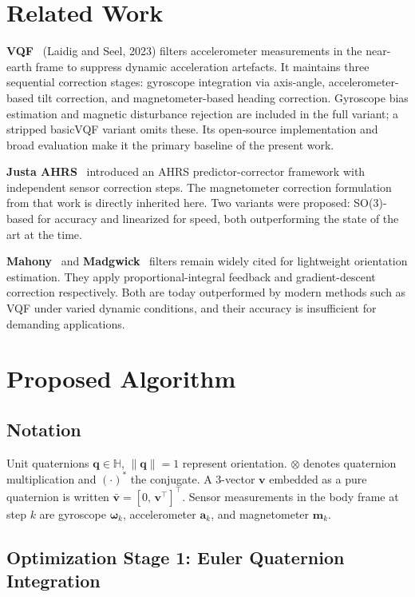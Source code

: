 \documentclass[conference]{IEEEtran}
\begin{document}
\section{Related Work}

\textbf{VQF}~\cite{laidig2023vqf} (Laidig and Seel, 2023) filters accelerometer measurements in the near-earth frame to suppress dynamic acceleration artefacts. It maintains three sequential correction stages: gyroscope integration via axis-angle, accelerometer-based tilt correction, and magnetometer-based heading correction. Gyroscope bias estimation and magnetic disturbance rejection are included in the full variant; a stripped basicVQF variant omits these. Its open-source implementation and broad evaluation make it the primary baseline of the present work.

\textbf{Justa AHRS}~\cite{justa2020} introduced an AHRS predictor-corrector framework with independent sensor correction steps. The magnetometer correction formulation from that work is directly inherited here. Two variants were proposed: SO(3)-based for accuracy and linearized for speed, both outperforming the state of the art at the time.

\textbf{Mahony}~\cite{mahony2008} and \textbf{Madgwick}~\cite{madgwick2010} filters remain widely cited for lightweight orientation estimation. They apply proportional-integral
 feedback and gradient-descent correction respectively. Both are today outperformed by modern methods such as VQF under varied dynamic conditions, 
 and their accuracy is insufficient for demanding applications.

\section{Proposed Algorithm}

\subsection{Notation}

Unit quaternions $\mathbf{q} \in \mathbb{H}$, $\|\mathbf{q}\|=1$ represent orientation. $\otimes$ denotes quaternion multiplication and $(\cdot)^*$ the conjugate. A 3-vector $\mathbf{v}$ embedded as a pure quaternion is written $\bar{\mathbf{v}} = [0,\,\mathbf{v}^\top]^\top$. Sensor measurements in the body frame at step $k$ are gyroscope $\boldsymbol{\omega}_k$, accelerometer $\mathbf{a}_k$, and magnetometer $\mathbf{m}_k$.

\subsection{Optimization Stage 1: Euler Quaternion Integration}
\end{document}

